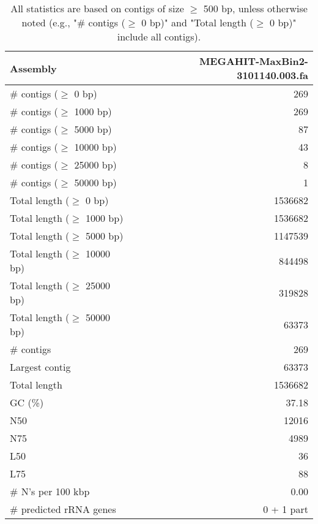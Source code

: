 \documentclass[12pt,a4paper]{article}
\begin{document}
\begin{table}[ht]
\begin{center}
\caption{All statistics are based on contigs of size $\geq$ 500 bp, unless otherwise noted (e.g., "\# contigs ($\geq$ 0 bp)" and "Total length ($\geq$ 0 bp)" include all contigs).}
\begin{tabular}{|l*{1}{|r}|}
\hline
Assembly & MEGAHIT-MaxBin2-3101140.003.fa \\ \hline
\# contigs ($\geq$ 0 bp) & 269 \\ \hline
\# contigs ($\geq$ 1000 bp) & 269 \\ \hline
\# contigs ($\geq$ 5000 bp) & 87 \\ \hline
\# contigs ($\geq$ 10000 bp) & 43 \\ \hline
\# contigs ($\geq$ 25000 bp) & 8 \\ \hline
\# contigs ($\geq$ 50000 bp) & 1 \\ \hline
Total length ($\geq$ 0 bp) & 1536682 \\ \hline
Total length ($\geq$ 1000 bp) & 1536682 \\ \hline
Total length ($\geq$ 5000 bp) & 1147539 \\ \hline
Total length ($\geq$ 10000 bp) & 844498 \\ \hline
Total length ($\geq$ 25000 bp) & 319828 \\ \hline
Total length ($\geq$ 50000 bp) & 63373 \\ \hline
\# contigs & 269 \\ \hline
Largest contig & 63373 \\ \hline
Total length & 1536682 \\ \hline
GC (\%) & 37.18 \\ \hline
N50 & 12016 \\ \hline
N75 & 4989 \\ \hline
L50 & 36 \\ \hline
L75 & 88 \\ \hline
\# N's per 100 kbp & 0.00 \\ \hline
\# predicted rRNA genes & 0 + 1 part \\ \hline
\end{tabular}
\end{center}
\end{table}
\end{document}
